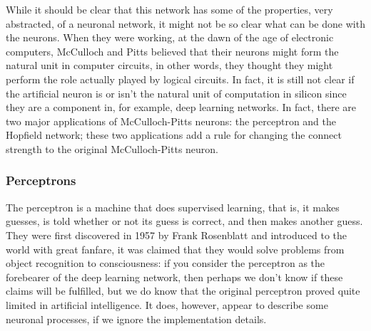 \documentclass[12pt]{article}
\begin{document}
While it should be clear that this network has some of the properties,
very abstracted, of a neuronal network, it might not be so clear what
can be done with the neurons. When they were working, at the dawn of
the age of electronic computers, McCulloch and Pitts believed that
their neurons might form the natural unit in computer circuits, in
other words, they thought they might perform the role actually played
by logical circuits. In fact, it is still not clear if the artificial
neuron is or isn't the natural unit of computation in silicon since
they are a component in, for example, deep learning networks. In fact,
there are two major applications of McCulloch-Pitts neurons: the
perceptron and the Hopfield network; these two applications add a rule
for changing the connect strength to the original McCulloch-Pitts
neuron.

\subsubsection*{Perceptrons}

The perceptron is a machine that does supervised learning, that is, it
makes guesses, is told whether or not its guess is correct, and then
makes another guess. They were first discovered in 1957 by Frank
Rosenblatt and introduced to the world with great fanfare, it was
claimed that they would solve problems from object recognition to
consciousness: if you consider the perceptron as the forebearer of the
deep learning network, then perhaps we don't know if these claims will
be fulfilled, but we do know that the original perceptron proved quite
limited in artificial intelligence. It does, however, appear to
describe some neuronal processes, if we ignore the implementation
details.
\end{document}
